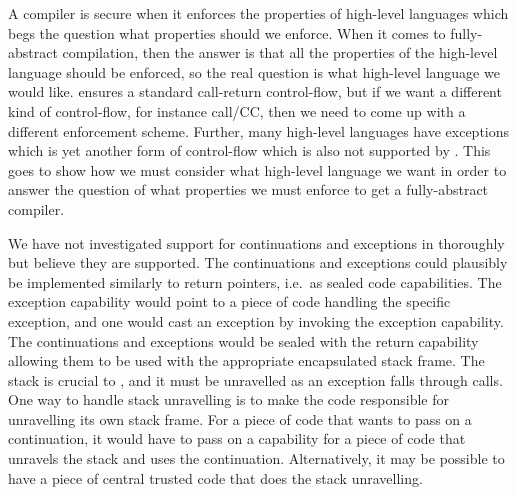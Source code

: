 

\begin{jversion}
  A compiler is secure when it enforces the properties of high-level languages which begs the question what properties should we enforce.
  When it comes to fully-abstract compilation, then the answer is that all the properties of the high-level language should be enforced, so the real question is what high-level language we would like.
  \stktokens{} ensures a standard call-return control-flow, but if we want a different kind of control-flow, for instance call/CC, then we need to come up with a different enforcement scheme.
  Further, many high-level languages have exceptions which is yet another form of control-flow which is also not supported by \stktokens{}.
  This goes to show how we must consider what high-level language we want in order to answer the question of what properties we must enforce to get a fully-abstract compiler.

  We have not investigated support for continuations and exceptions in \stktokens{} thoroughly but believe they are supported.
  The continuations and exceptions could plausibly be implemented similarly to return pointers, i.e.\ as sealed code capabilities.
  The exception capability would point to a piece of code handling the specific exception, and one would cast an exception by invoking the exception capability.
  The continuations and exceptions would be sealed with the return capability allowing them to be used with the appropriate encapsulated stack frame.
  The stack is crucial to \stktokens{}, and it must be unravelled as an exception falls through calls.
  One way to handle stack unravelling is to make the code responsible for unravelling its own stack frame.
  For a piece of code that wants to pass on a continuation, it would have to pass on a capability for a piece of code that unravels the stack and uses the continuation.
  Alternatively, it may be possible to have a piece of central trusted code that does the stack unravelling.


\end{jversion}
